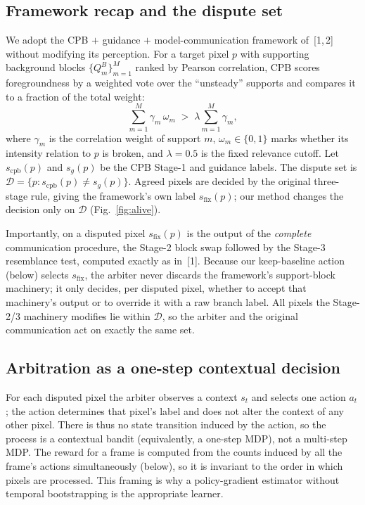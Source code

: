 \documentclass[sn-basic]{sn-jnl}
\begin{document}
\subsection{Framework recap and the dispute set}
\label{sec:recap}
We adopt the CPB $+$ guidance $+$ model-communication framework of~[1,\,2] without
modifying its perception. For a target pixel $p$ with supporting background blocks
$\{Q^{B}_{m}\}_{m=1}^{M}$ ranked by Pearson correlation, CPB scores
foregroundness by a weighted vote over the ``unsteady'' supports and compares it to a
fraction of the total weight:
\begin{equation}
\sum_{m=1}^{M}\gamma_m\,\omega_m \;>\; \lambda \sum_{m=1}^{M}\gamma_m,
\label{eq:cpb}
\end{equation}
where $\gamma_m$ is the correlation weight of support $m$, $\omega_m\in\{0,1\}$
marks whether its intensity relation to $p$ is broken, and
$\lambda=0.5$ is the fixed relevance cutoff. Let $s_{\text{cpb}}(p)$ and
$s_{g}(p)$ be the CPB Stage-1 and guidance labels. The dispute set is
$\mathcal{D}=\{p : s_{\text{cpb}}(p)\neq s_{g}(p)\}$. Agreed pixels are decided by
the original three-stage rule, giving the framework's own label
$s_{\text{fix}}(p)$; our method changes the decision only on $\mathcal{D}$
(Fig.~\ref{fig:alive}).

Importantly, on a disputed pixel $s_{\text{fix}}(p)$ is the output of the
\emph{complete} communication procedure, the Stage-2 block swap
followed by the Stage-3 resemblance test, computed
exactly as in~[1]. Because our keep-baseline action (below) selects
$s_{\text{fix}}$, the arbiter never discards the framework's support-block
machinery; it only decides, per disputed pixel, whether to accept that machinery's
output or to override it with a raw branch label. All pixels the Stage-2/3 machinery
modifies lie within $\mathcal{D}$, so the arbiter and the original communication act
on exactly the same set.

\subsection{Arbitration as a one-step contextual decision}
For each disputed pixel the arbiter observes a context $s_t$ and selects one action
$a_t$; the action determines that pixel's label and does not alter the context of
any other pixel. There is thus no state transition induced by the action, so the
process is a contextual bandit (equivalently, a one-step MDP), not a multi-step MDP.
The reward for a frame is computed from the counts induced by all the frame's
actions simultaneously (below), so it is invariant to the order in which pixels are
processed. This framing is why a policy-gradient estimator without temporal
bootstrapping is the appropriate learner.
\end{document}
